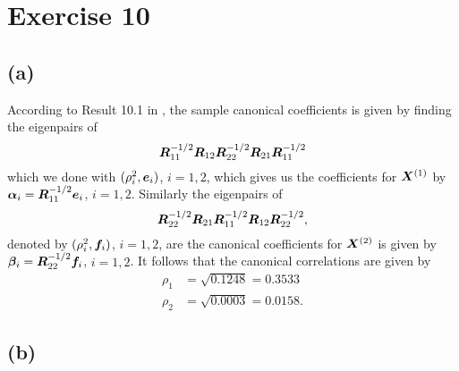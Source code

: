 \section*{Exercise 10}
\label{sec:exercise-10}

\subsection*{(a)}
\label{sec:a-6}

According to Result 10.1 in \cite[p. 541]{book}, the sample canonical coefficients is given by finding the eigenpairs of
\begin{equation*}
  \bm{R}_{11}^{-1/2} \bm{R}_{12} \bm{R}_{22}^{-1/2} \bm{R}_{21} \bm{R}_{11}^{-1/2}
\end{equation*}
which we done with $(\rho^{2}_{i}, \bm{e}_{i})$, $i =1,2$, which gives us the
coefficients for $\bm{X}^{(1)}$ by $\bm{\alpha}_{i} = \bm{R}_{11}^{-1/2} \bm{e}_{i}$, $i =1,2$. Similarly the eigenpairs of
\begin{equation*}
  \bm{R}_{22}^{-1/2} \bm{R}_{21} \bm{R}_{11}^{-1/2} \bm{R}_{12} \bm{R}_{22}^{-1/2},
\end{equation*}
denoted by $(\rho^{2}_{i}, \bm{f}_{i})$, $i =1,2$, are the canonical coefficients for $\bm{X}^{(2)}$ is given by $\bm{\beta}_{i} = \bm{R}_{22}^{-1/2} \bm{f}_{i}$, $i= 1,2$. It
follows that the canonical correlations are given by
\begin{align*}
  \rho_{1} &=  \sqrt{0.1248} =  0.3533\\
  \rho_{2} &=  \sqrt{0.0003} = 0.0158.
\end{align*}

\subsection*{(b)}
\label{sec:b-9}


